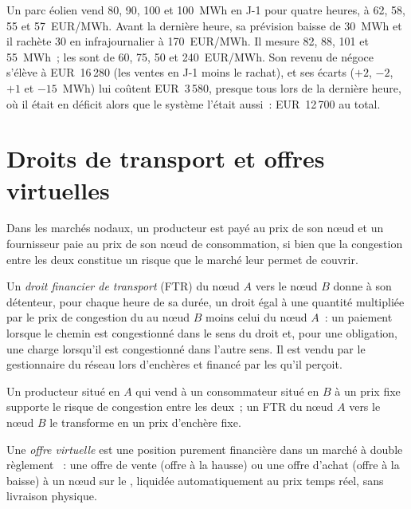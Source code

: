 \begin{example}\label{ex:m3:power-markets-trading:wind}
Un parc éolien vend 80, 90, 100 et 100~MWh en J-1 pour quatre heures, à 62, 58, 55 et
\qty{57}{EUR/MWh}. Avant la dernière heure, sa prévision baisse de 30~MWh et il rachète 30 en infrajournalier à
\qty{170}{EUR/MWh}. Il mesure 82, 88, 101 et 55~MWh~; les  sont de 60,
75, 50 et \qty{240}{EUR/MWh}. Son revenu de négoce s'élève à EUR~16\,280 (les ventes en J-1 moins
le rachat), et ses écarts ($+2$, $-2$, $+1$ et $-15$~MWh) lui coûtent EUR~3\,580, presque
tous lors de la dernière heure, où il était en déficit alors que le système l'était aussi~: EUR~12\,700 au total.
\end{example}

\section{Droits de transport et offres virtuelles}

Dans les marchés nodaux, un producteur est payé au prix de son nœud et un fournisseur paie au prix de son nœud de consommation, si bien que
la congestion entre les deux constitue un risque que le marché leur permet de couvrir.

\begin{definition}\label{def:m3:power-markets-trading:ftr}
Un \emph{droit financier de transport} (FTR) du nœud $A$
vers le nœud $B$ donne à son détenteur, pour chaque heure de sa durée, un droit égal à une quantité multipliée par le prix de congestion du 
au nœud $B$ moins celui du nœud $A$~: un paiement lorsque le chemin est congestionné dans le
sens du droit et, pour une obligation, une charge lorsqu'il est congestionné dans l'autre sens.
Il est vendu par le gestionnaire du réseau lors d'enchères et financé par les  qu'il perçoit.
\end{definition}

Un producteur situé en $A$ qui vend à un consommateur situé en $B$ à un prix fixe supporte le risque de congestion entre
les deux~; un FTR du nœud $A$ vers le nœud $B$ le transforme en un prix d'enchère fixe.

\begin{definition}\label{def:m3:power-markets-trading:virtual}
Une \emph{offre virtuelle} est une position purement financière dans un marché à double règlement
~: une offre de vente (offre à la hausse) ou une offre d'achat (offre à la baisse) à un nœud sur le
, liquidée automatiquement au prix temps réel, sans livraison
physique.
\end{definition}

